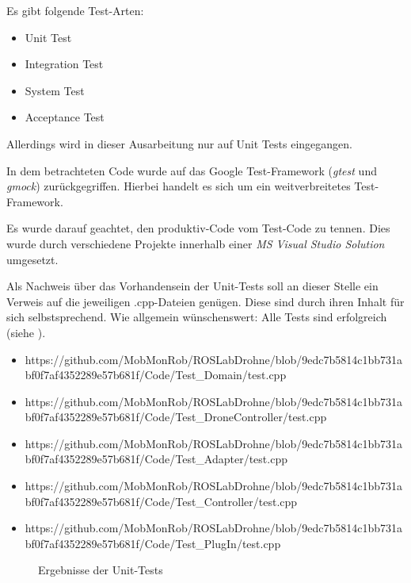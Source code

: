 Es gibt folgende Test-Arten:
\begin{itemize}
\item Unit Test
\item Integration Test
\item System Test
\item Acceptance Test
\end{itemize}

Allerdings wird in dieser Ausarbeitung nur auf Unit Tests eingegangen.


In dem betrachteten Code wurde auf das Google Test-Framework (\textit{gtest} und \textit{gmock}) zurückgegriffen. Hierbei handelt es sich um ein weitverbreitetes Test-Framework. 

Es wurde darauf geachtet, den produktiv-Code vom Test-Code zu tennen. Dies wurde durch verschiedene Projekte innerhalb einer \textit{MS Visual Studio Solution} umgesetzt.


Als Nachweis über das Vorhandensein der Unit-Tests soll an dieser Stelle ein Verweis auf die jeweiligen .cpp-Dateien genügen. Diese sind durch ihren Inhalt für sich selbstsprechend. Wie allgemein wünschenswert: Alle Tests sind erfolgreich (siehe ).

\begin{itemize}
\item https://github.com/MobMonRob/ROSLabDrohne/blob/9edc7b5814c1bb731abf0f7af4352289e57b681f/Code/Test\_Domain/test.cpp
\item https://github.com/MobMonRob/ROSLabDrohne/blob/9edc7b5814c1bb731abf0f7af4352289e57b681f/Code/Test\_DroneController/test.cpp
\item https://github.com/MobMonRob/ROSLabDrohne/blob/9edc7b5814c1bb731abf0f7af4352289e57b681f/Code/Test\_Adapter/test.cpp
\item https://github.com/MobMonRob/ROSLabDrohne/blob/9edc7b5814c1bb731abf0f7af4352289e57b681f/Code/Test\_Controller/test.cpp
\item https://github.com/MobMonRob/ROSLabDrohne/blob/9edc7b5814c1bb731abf0f7af4352289e57b681f/Code/Test\_PlugIn/test.cpp
\end{itemize}

\begin{figure}[ht!]
\vspace{0.25cm}
\begin{center}
\caption{Ergebnisse der Unit-Tests}
\label{fig:TestRes}
\end{center}

\vspace{0.25cm}
\end{figure}


